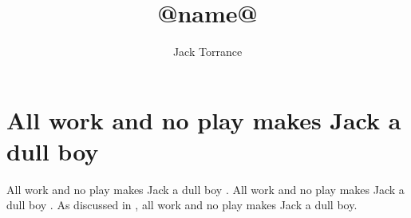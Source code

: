 \documentclass{article}
\title{@name@}
\author{Jack Torrance}
\begin{document}
\maketitle

\section{All work and no play makes Jack a dull boy}

All work and no play makes Jack a dull boy \citep{Brenguier2008, Veen2008}.
All work and no play makes Jack a dull boy \citep{Jack1980}.
As discussed in \citet{Boyd2004}, all work and no play makes Jack a dull boy.



\end{document}
